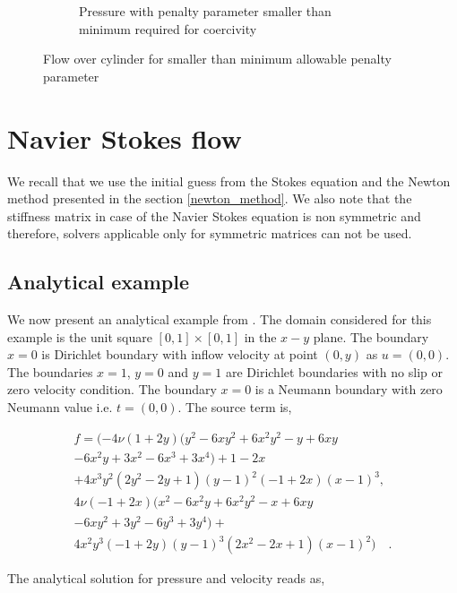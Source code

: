 \documentclass[a4paper,openany]{book}
\begin{document}
\begin{figure}
\begin{subfigure}{\textwidth}
    \caption{Pressure with penalty parameter smaller than minimum required for coercivity}
      \label{pressure_stoke_c11_low}
\end{subfigure}
\caption{Flow over cylinder for smaller than minimum allowable penalty parameter}
\label{flow_over_cylinder_c11_low}
\end{figure}

\section{Navier Stokes flow}\label{N-S-ch5}

We recall that we use the initial guess from the Stokes equation and the Newton method presented in the section \ref{newton_method}. We also note that the stiffness matrix in case of the Navier Stokes equation is non symmetric and therefore, solvers applicable only for symmetric matrices can not be used. 

\subsection{Analytical example}

We now present an analytical example from \cite{Montlaur}. The domain considered for this example is the unit square $[0,1] \times [0,1]$ in the $x-y$ plane. 
The boundary ${x=0}$ is Dirichlet boundary with inflow velocity at point $(0,y)$ as $u = (0, 0)$. The boundaries ${x = 1}$, ${y = 0}$ and ${y = 1}$ are Dirichlet boundaries with no slip or zero velocity condition. The boundary ${x = 0}$ is a Neumann boundary with zero Neumann value i.e. $t = (0, 0)$. The source term is,

\begin{equation}
\begin{split}
f = (-4 \nu (1+2y) (y^2 - 6xy^2 + 6x^2 y^2 - y + 6xy \\ - 6x^2 y + 3x^2 - 6x^3 + 3x^4)+ 1 - 2x \\+ 4x^3 y^2 (2y^2 - 2y + 1)(y - 1)^2 (-1 + 2x)(x - 1)^3,\\ 4 \nu (-1 + 2x)(x^2 - 6x^2 y + 6x^2 y^2 - x + 6xy \\ - 6xy^2 + 3y^2 - 6y^3 + 3y^4) + \\ 4x^2y^3 (-1+2y)(y-1)^3 (2x^2-2x+1)(x-1)^2) \quad \textrm{.}
\end{split}
\end{equation}
 
The analytical solution for pressure and velocity reads as,
\end{document}
